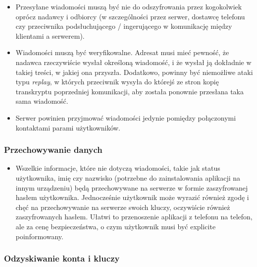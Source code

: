 \documentclass{article}
\begin{document}
\begin{itemize}
\item Przesyłane wiadomości muszą być nie do odszyfrowania przez kogokolwiek oprócz nadawcy i odbiorcy (w szczególności
przez serwer, dostawcę telefonu czy przeciwnika podsłuchującego / ingerującego w komunikację między klientami a serwerem). 

\item Wiadomości muszą być weryfikowalne. Adresat musi mieć pewność, że nadawca rzeczywiście wysłał określoną wiadomość,
i że wysłał ją dokładnie w takiej treści, w jakiej ona przyszła. Dodatkowo, powinny być niemożliwe ataki typu \emph{replay}, 
w których przeciwnik wysyła do którejś ze stron kopię transkryptu poprzedniej komunikacji, aby została ponownie przesłana 
taka sama wiadomość. 

\item Serwer powinien przyjmować wiadomości jedynie pomiędzy połączonymi kontaktami parami użytkowników.
\end{itemize}

\subsubsection{Przechowywanie danych}

\begin{itemize}
\item Wszelkie informacje, które nie dotyczą wiadomości, takie jak status użytkownika, imię czy nazwisko (potrzebne do
zainstalowania aplikacji na innym urządzeniu) będą przechowywane na serwerze w formie zaszyfrowanej hasłem użytkownika.
Jednocześnie użytkownik może wyrazić również zgodę i chęć na przechowywanie na serwerze swoich kluczy, oczywiście
również zaszyfrowanych hasłem. Ułatwi to przenoszenie aplikacji z telefonu na telefon, ale za cenę bezpieczeństwa,
o czym użytkownik musi być explicite poinformowany.
 
\end{itemize}

\subsubsection{Odzyskiwanie konta i kluczy}
\end{document}

